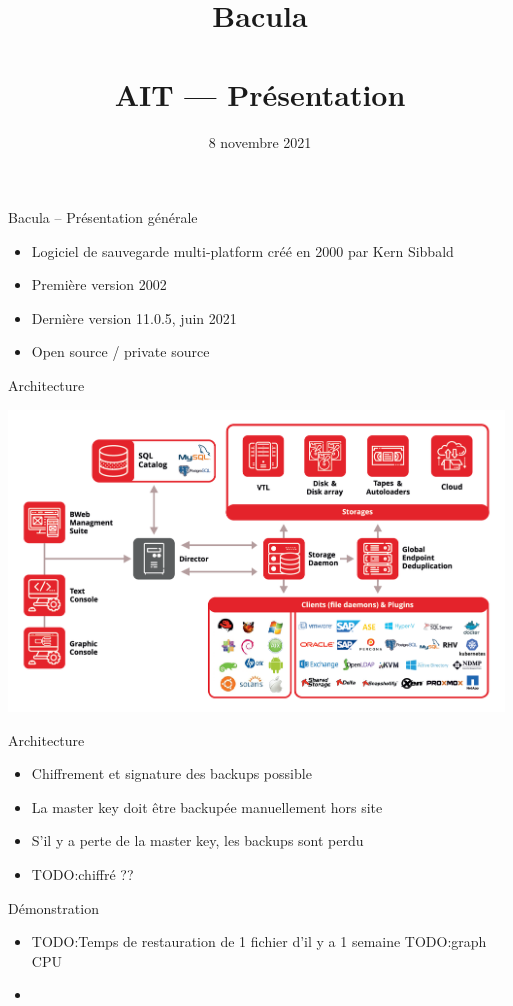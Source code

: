 \documentclass[aspectratio=169]{beamer}
\title{Bacula\\~\\AIT --- Présentation}
\date{8 novembre 2021}
\newcommand{\TODO}{TODO:}
\begin{document}
\begin{frame}
  \titlepage
\end{frame}

\begin{frame}{Bacula -- Présentation générale}
 \begin{itemize}
  \item Logiciel de sauvegarde multi-platform créé en 2000 par Kern Sibbald
  \item Première version 2002
  \item Dernière version 11.0.5, juin 2021
  \item Open source / private source %
 \end{itemize}
\end{frame}

\begin{frame}{Architecture}
  \begin{center}
    \includegraphics[height=80mm]{architecture.png}
  \end{center}  
\end{frame}
\begin{frame}{Architecture}
 \begin{itemize}
  \item Chiffrement et signature des backups possible
  \item La master key doit être backupée manuellement hors site
  \item S'il y a perte de la master key, les backups sont perdu
  \item \TODO chiffré ??
 \end{itemize}
\end{frame}

\begin{frame}{Démonstration}
 \begin{itemize}
  \item \TODO Temps de restauration de 1 fichier d'il y a 1 semaine
  \TODO graph CPU
  \item 
 \end{itemize}
\end{frame}
\end{document}
